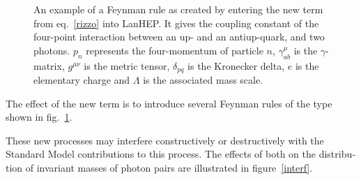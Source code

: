 \begin{english}
\begin{figure}[htp]\begin{center}
{\footnotesize{}
}\end{center}
\caption{An example of a Feynman rule as created by entering the new term from eq.~\eqref{rizzo} into LanHEP\cite{lanhep}. It gives the coupling constant of the four-point interaction between an up- and an antiup-quark, and two photons. $p_n$ represents the four-momentum of particle $n$, $\gamma_{ab}^\mu$ is the $\gamma$-matrix, $g^{\mu\nu}$ is the metric tensor, $\delta_{pq}$ is the Kronecker delta, $e$ is the elementary charge and $\Lambda$ is the associated mass scale.\label{rule}}
\end{figure}

The effect of the new term is to introduce several Feynman rules of the type shown in fig.~\ref{rule}.

\begin{new}
These new processes may interfere constructively or destructively with the Standard Model contributions to this process. The effects of both on the distribution of invariant masses of photon pairs are illustrated in figure~\ref{interf}.


\end{new}
\end{english}
